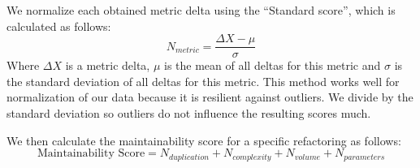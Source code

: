 We normalize each obtained metric delta using the ``Standard score'', which is calculated as follows:
\begin{equation}\label{eq:scoredev}
N_{metric} = \frac {\Delta X-\mu}{\sigma}
\end{equation}
Where $\Delta X$ is a metric delta, $\mu$ is the mean of all deltas for this metric and $\sigma$ is the standard deviation of all deltas for this metric. This method works well for normalization of our data because it is resilient against outliers. We divide by the standard deviation so outliers do not influence the resulting scores much.

We then calculate the maintainability score for a specific refactoring as follows:
\begin{equation}\label{eq:scoreref}
\text{Maintainability Score} = N_{duplication} + N_{complexity} + N_{volume} + N_{parameters}
\end{equation}
